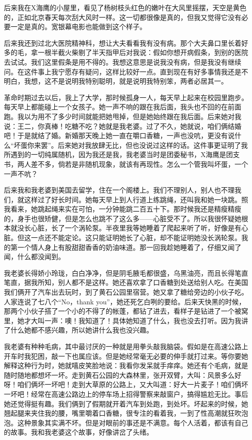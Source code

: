 后来我在X海鹰的小屋里，看见了杨树枝头红色的嫩叶在大风里摇摆，天空是黄色的，正如北京春天每次刮大风时一样。这一切都很像是真的，但我又觉得它没有必要一定是真的。宽银幕电影也能做到这个样子。 

后来我还到过北大医院精神科，想让大夫看看我有没有病。那个大夫鼻口里长着好多的毛，拿一根半截火柴剔了半天指甲后对我说：假如你想开病假条，到别的医院去试试。我们这里假条是用不得的。我想这意思是说我没有病，但是我没有继续问。在这件事上我宁愿存有疑问，这样比较好一点。直到现在有好多事情我还是不明白，我想，这不是说明我特别聪明，就是说明我特别笨，两者必居其一。 

革命时期过去以后，我上了大学，那时候孤身一人，每天早上起来在校园里跑步。每天早上都能碰上一个女孩子。她一声不响的跟在我后面，我头也不回的在前面跑。我以为用不了多少时间就能把她甩掉，但是她始终跟在我后面。后来她对我说：王二，你真棒！吃糖不吃？她就是我老婆。过了不久，她就说，咱们俩结婚吧！于是就结了婚。新婚那天晚上她一直在嚼口香糖，一声也没吭，更没有说什么“坏蛋你来罢”。后来她对我放肆无比，但也没说过这样的话。这件事更证明了我所遇到的一切纯属随机，因为我还是我，我老婆当时是团委秘书，X海鹰是团支书，两人差不多，倘若是非随机现象，就该有再现性。怎么一个管我叫坏蛋，一个一声不吭？ 

后来我和我老婆到美国去留学，住在一个阁楼上。我们不理别人，别人也不理我们，就这样过了好长时间。她每天早上到人行道上练跳绳，还叫我和她一块跳。照我看来，她跳起绳来实在可怕，一分钟能跳二百五十下。那时候我还是精瘦精瘦的，身手也很矫健，但是怎么也跳不了这么多——心脏受不了。所以我很怀疑她根本就没长心脏，长了一个涡轮泵。半夜里我等她睡着了爬起来听了听，好像是有心脏。但这一点还不能定论。这只能证明她长了心脏，却不能证明她没长涡轮泵。我的第一个情人身上有股甜甜香香的奶油味道。那一回我趁她睡着了，仔细又闻了闻，什么都没闻到。 

我老婆长得娇小玲珑，白白净净，但是阴毛腋毛都很盛，乌黑油亮，而且长得笔直笔直，据我所知，别人都不是这样。她还喜欢拿了口香糖到处送给别人吃。在美国我们俩开了汽车出去玩时，到了黄石公园里宿营。她又拿了糖给旁边的小伙子吃。人家连说了七八个“No，thank you”，她还死乞白咧的要给。后来天快黑的时候，那两个小伙子搭了一个小的不得了的帐蓬，都钻了进去，看样子是钻进了一个被窝里，她才大叫一声：噢！我知道了！具体她知道了什么，我也没去打听。因为我讲了什么她都不感兴趣，所以她讲什么我也没兴趣。 

我老婆有种种毛病，其中最讨厌的一种就是用拳头敲我脑袋。假如是在高速公路上开车时我犯困，敲一下也属应该。但是她经常毫无必要的伸手就打过来。等你要她解释这种行为时，她就嘻皮笑脸地说：我看你发呆就手痒痒。她还有个毛病，就是随时随地都想坏一坏。走到黄石公园的大森林里，张开双臂，大叫：风景多么好呀！咱们俩坏一坏吧！走到大草原的公路上，又大叫道：好大一片麦子！咱们俩坏一坏吧！经常在高速公路边上的停车场上招得警察来敲窗户，搞得尴尬无比。事后她还觉得挺有趣。我们俩到了假期就开着汽车到处跑，到处坏。坏起来的时候，她翘起腿来夹住我的腰，嘴里嚼着口香糖，很专注的看着我，一到了性高潮就狂吹泡泡。这种景象其实满不坏。但是对眼前的事还是不满意。每个人活着，都该有自己的故事。我和我老婆这个故事，好像讲岔了头绪。 

